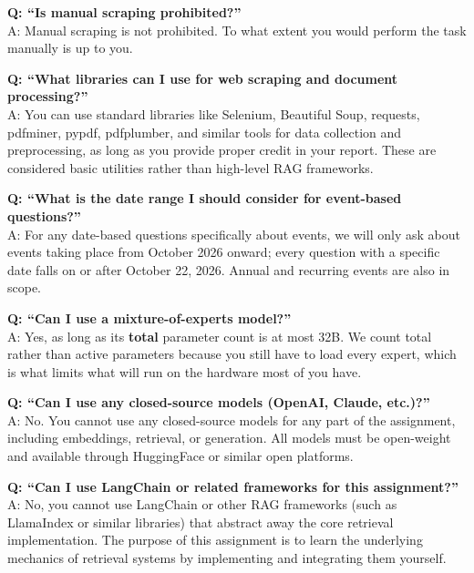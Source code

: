 \documentclass[11pt]{article}
\begin{document}
\vspace{0.6em}
\noindent\textbf{Q: ``Is manual scraping prohibited?''}\\
A: Manual scraping is not prohibited. To what extent you would perform the task manually is up to you.

\vspace{0.6em}
\noindent\textbf{Q: ``What libraries can I use for web scraping and document processing?''}\\
A: You can use standard libraries like Selenium, Beautiful Soup, requests, pdfminer, pypdf,
pdfplumber, and similar tools for data collection and preprocessing, as long as you provide proper
credit in your report. These are considered basic utilities rather than high-level RAG frameworks.

\vspace{0.6em}
\noindent\textbf{Q: ``What is the date range I should consider for event-based questions?''}\\
A: For any date-based questions specifically about events, we will only ask about events taking
place from October 2026 onward; every question with a specific date falls on or after October 22,
2026. Annual and recurring events are also in scope.

\vspace{0.6em}
\noindent\textbf{Q: ``Can I use a mixture-of-experts model?''}\\
A: Yes, as long as its \textbf{total} parameter count is at most 32B. We count total rather than
active parameters because you still have to load every expert, which is what limits what will run on
the hardware most of you have.

\vspace{0.6em}
\noindent\textbf{Q: ``Can I use any closed-source models (OpenAI, Claude, etc.)?''}\\
A: No. You cannot use any closed-source models for any part of the assignment, including embeddings,
retrieval, or generation. All models must be open-weight and available through HuggingFace or similar
open platforms.

\vspace{0.6em}
\noindent\textbf{Q: ``Can I use LangChain or related frameworks for this assignment?''}\\
A: No, you cannot use LangChain or other RAG frameworks (such as LlamaIndex or similar libraries) that
abstract away the core retrieval implementation. The purpose of this assignment is to learn the
underlying mechanics of retrieval systems by implementing and integrating them yourself.
\end{document}
